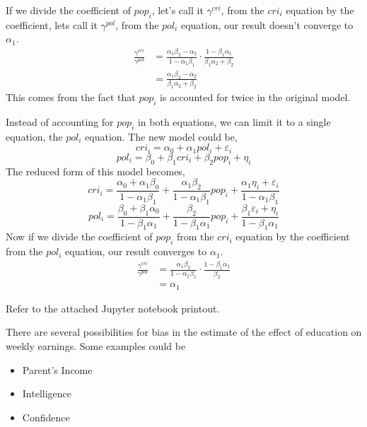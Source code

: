 \documentclass[12pt,twoside]{article}
\begin{document}
\begin{problems}
\begin{problemparts}
If we divide the coefficient of $pop_i$, let's call it
$\gamma^{cri}$, from the $cri_i$ equation by the coefficient, lets call
it $\gamma^{pol}$, from the $pol_i$ equation, our result doesn't
converge to $\alpha_1$.
\begin{align*}
    \frac{\gamma^{cri}}{\gamma^{pol}} &= \frac{\alpha_1 \beta_2 -
    \alpha_2}{1 - \alpha_1 \beta_1} \cdot \frac{1 - \beta_1 \alpha_1}{\beta_1
    \alpha_2 + \beta_2} \\
    &= \frac{\alpha_1 \beta_2 - \alpha_2}{\beta_1 \alpha_2 + \beta_2}
\end{align*}
This comes from the fact that $pop_i$ is accounted for twice in the
original model.

\problempart %

Instead of accounting for $pop_i$ in both equations, we can limit it to
a single equation, the $pol_i$ equation. The new model could be,
$$ cri_i = \alpha_0 + \alpha_1 pol_i + \varepsilon_i $$
$$ pol_i = \beta_0 + \beta_1 cri_i + \beta_2 pop_i + \eta_i $$
The reduced form of this model becomes,
$$ cri_i = \frac{\alpha_0 + \alpha_1 \beta_0}{1 - \alpha_1 \beta_1} +
\frac{\alpha_1 \beta_2}{1 - \alpha_1\beta_1} pop_i + \frac{\alpha_1 \eta_i +
\varepsilon_i}{1 - \alpha_1 \beta_1} $$
$$ pol_i = \frac{\beta_0 + \beta_1 \alpha_0}{1 - \beta_1 \alpha_1} +
\frac{\beta_2}{1 - \beta_1\alpha_1} pop_i + \frac{\beta_1 \varepsilon_i +
\eta_i}{1 - \beta_1 \alpha_1} $$
Now if we divide the coefficient of $pop_i$ from the $cri_i$ equation by the
coefficient from the $pol_i$ equation, our result converges to $\alpha_1$.
\begin{align*}
    \frac{\gamma^{cri}}{\gamma^{pol}} &= \frac{\alpha_1 \beta_2}{1 -
    \alpha_1\beta_1} \cdot \frac{1 - \beta_1\alpha_1}{\beta_2} \\
    &= \alpha_1
\end{align*}

\end{problemparts}

\newpage

\problem  %

\begin{problemparts}

\problempart %

Refer to the attached Jupyter notebook printout.

\problempart %

There are several possibilities for bias in the estimate of the effect of
education on weekly earnings. Some examples could be
\begin{itemize}
    \item Parent's Income
    \item Intelligence
    \item Confidence
\end{itemize}


\end{problemparts}
\end{problems}
\end{document}
